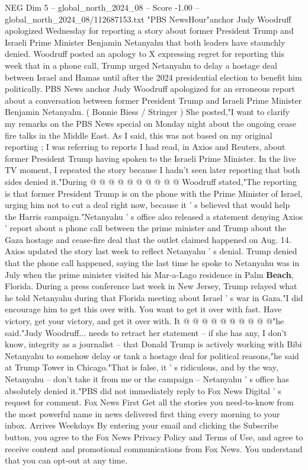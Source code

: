 \begin{textsample}{NEG Dim 5 – global\_north\_2024\_08 – Score -1.00 – global\_north\_2024\_08/112687153.txt}  \label{ex:f5_neg_066}
"PBS NewsHour"anchor Judy Woodruff apologized Wednesday for reporting a story about former President Trump and Israeli Prime Minister Benjamin Netanyahu that both leaders have staunchly denied.
Woodruff posted an apology to X expressing regret for reporting this week that in a phone call, Trump urged Netanyahu to delay a hostage deal between Israel and Hamas until after the 2024 presidential election to benefit him politically.
PBS News anchor Judy Woodruff apologized for an erroneous report about a conversation between former President Trump and Israeli Prime Minister Benjamin Netanyahu. ( Bonnie Biess / Stringer ) She posted,"I want to clarify my remarks on the PBS News special on Monday night about the ongoing cease fire talks in the Middle East.
As I said, this was not based on my original reporting ; I was referring to reports I had read, in Axios and Reuters, about former President Trump having spoken to the Israeli Prime Minister.
In the live TV moment, I repeated the story because I hadn't seen later reporting that both sides denied it."During @ @ @ @ @ @ @ @ @ @ Woodruff stated,"The reporting is that former President Trump is on the phone with the Prime Minister of Israel, urging him not to cut a deal right now, because it ' s believed that would help the Harris campaign."Netanyahu ' s office also released a statement denying Axios ' report about a phone call between the prime minister and Trump about the Gaza hostage and cease-fire deal that the outlet claimed happened on Aug. 14.
Axios updated the story last week to reflect Netanyahu ' s denial.
Trump denied that the phone call happened, saying the last time he spoke to Netanyahu was in July when the prime minister visited his Mar-a-Lago residence in Palm \textbf{Beach}, Florida.
During a press conference last week in New Jersey, Trump relayed what he told Netanyahu during that Florida meeting about Israel ' s war in Gaza."I did encourage him to get this over with.
You want to get it over with fast.
Have victory, get your victory, and get it over with.
It @ @ @ @ @ @ @ @ @ @"he said."Judy Woodruff... needs to retract her statement -- if she has any, I don't know, integrity as a journalist -- that Donald Trump is actively working with Bibi Netanyahu to somehow delay or tank a hostage deal for political reasons,"he said at Trump Tower in Chicago."That is false, it ' s ridiculous, and by the way, Netanyahu -- don't take it from me or the campaign -- Netanyahu ' s office has absolutely denied it."PBS did not immediately reply to Fox News Digital ' s request for comment.
Fox News First Get all the stories you need-to-know from the most powerful name in news delivered first thing every morning to your inbox.
Arrives Weekdays By entering your email and clicking the Subscribe button, you agree to the Fox News Privacy Policy and Terms of Use, and agree to receive content and promotional communications from Fox News.
You understand that you can opt-out at any time.

\end{textsample}
